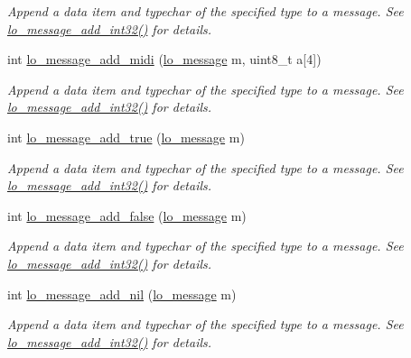 \begin{DoxyCompactItemize}
\begin{DoxyCompactList}\small\item\em Append a data item and typechar of the specified type to a message. See \hyperlink{group__liblolowlevel_ga7c9df1bd975a32fb6c8105e6fe327149}{lo\+\_\+message\+\_\+add\+\_\+int32()} for details. \end{DoxyCompactList}\item 
int \hyperlink{group__liblolowlevel_gaaea6ac25787de608199a988dc214f32e}{lo\+\_\+message\+\_\+add\+\_\+midi} (\hyperlink{lo__types_8h_ad126083c98d941f00eb72d1690b38d63}{lo\+\_\+message} m, uint8\+\_\+t a\mbox{[}4\mbox{]})
\begin{DoxyCompactList}\small\item\em Append a data item and typechar of the specified type to a message. See \hyperlink{group__liblolowlevel_ga7c9df1bd975a32fb6c8105e6fe327149}{lo\+\_\+message\+\_\+add\+\_\+int32()} for details. \end{DoxyCompactList}\item 
int \hyperlink{group__liblolowlevel_ga9da3df4838126910171a8e45ea34e9ec}{lo\+\_\+message\+\_\+add\+\_\+true} (\hyperlink{lo__types_8h_ad126083c98d941f00eb72d1690b38d63}{lo\+\_\+message} m)
\begin{DoxyCompactList}\small\item\em Append a data item and typechar of the specified type to a message. See \hyperlink{group__liblolowlevel_ga7c9df1bd975a32fb6c8105e6fe327149}{lo\+\_\+message\+\_\+add\+\_\+int32()} for details. \end{DoxyCompactList}\item 
int \hyperlink{group__liblolowlevel_ga1c8a136e87e3d2befeb466e0a8a5a4ad}{lo\+\_\+message\+\_\+add\+\_\+false} (\hyperlink{lo__types_8h_ad126083c98d941f00eb72d1690b38d63}{lo\+\_\+message} m)
\begin{DoxyCompactList}\small\item\em Append a data item and typechar of the specified type to a message. See \hyperlink{group__liblolowlevel_ga7c9df1bd975a32fb6c8105e6fe327149}{lo\+\_\+message\+\_\+add\+\_\+int32()} for details. \end{DoxyCompactList}\item 
int \hyperlink{group__liblolowlevel_gabd3cd7f86137ae1a180e33c3bc5c9644}{lo\+\_\+message\+\_\+add\+\_\+nil} (\hyperlink{lo__types_8h_ad126083c98d941f00eb72d1690b38d63}{lo\+\_\+message} m)
\begin{DoxyCompactList}\small\item\em Append a data item and typechar of the specified type to a message. See \hyperlink{group__liblolowlevel_ga7c9df1bd975a32fb6c8105e6fe327149}{lo\+\_\+message\+\_\+add\+\_\+int32()} for details. \end{DoxyCompactList}\item 

\end{DoxyCompactItemize}
